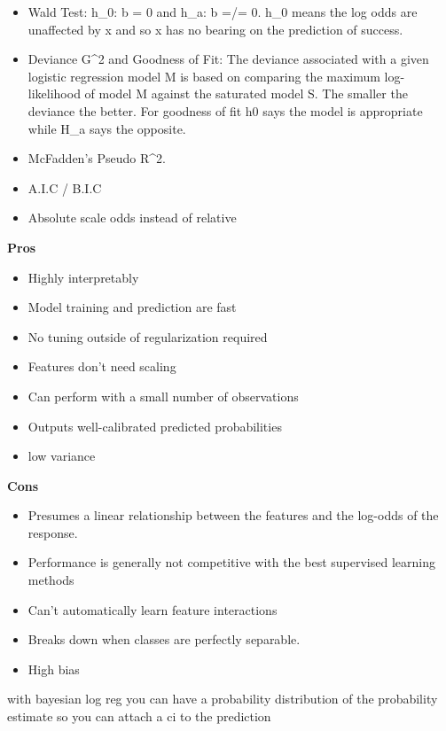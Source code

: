\documentclass[]{book}
\begin{document}
\begin{itemize}
\item
  Wald Test: h\_0: b = 0 and h\_a: b =/= 0. h\_0 means the log odds are
  unaffected by x and so x has no bearing on the prediction of success.
\item
  Deviance G\^{}2 and Goodness of Fit: The deviance associated with a
  given logistic regression model M is based on comparing the maximum
  log-likelihood of model M against the saturated model S. The smaller
  the deviance the better. For goodness of fit h0 says the model is
  appropriate while H\_a says the opposite.
\item
  McFadden's Pseudo R\^{}2.
\item
  A.I.C / B.I.C
\item
  Absolute scale odds instead of relative
\end{itemize}

\textbf{Pros}

\begin{itemize}
\item
  Highly interpretably
\item
  Model training and prediction are fast
\item
  No tuning outside of regularization required
\item
  Features don't need scaling
\item
  Can perform with a small number of observations
\item
  Outputs well-calibrated predicted probabilities
\item
  low variance
\end{itemize}

\textbf{Cons}

\begin{itemize}
\item
  Presumes a linear relationship between the features and the log-odds
  of the response.
\item
  Performance is generally not competitive with the best supervised
  learning methods
\item
  Can't automatically learn feature interactions
\item
  Breaks down when classes are perfectly separable.
\item
  High bias
\end{itemize}

with bayesian log reg you can have a probability distribution of the
probability estimate so you can attach a ci to the prediction
\end{document}
